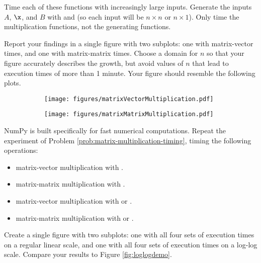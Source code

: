 Time each of these functions with increasingly large inputs.
Generate the inputs $A$, $\x$, and $B$ with  and  (so each input will be $n \times n$ or $n \times 1$).
Only time the multiplication functions, not the generating functions.

Report your findings in a single figure with two subplots: one with matrix-vector times, and one with matrix-matrix times.
Choose a domain for $n$ so that your figure accurately describes the growth, but avoid values of $n$ that lead to execution times of more than 1 minute.
Your figure should resemble the following plots.

\begin{figure}[H] %
\captionsetup[subfigure]{justification=centering}
\centering
\begin{subfigure}{.5\textwidth}
    \centering
    \texttt{[image: figures/matrixVectorMultiplication.pdf]}
\end{subfigure}%
\begin{subfigure}{.482\textwidth}
    \centering
    \texttt{[image: figures/matrixMatrixMultiplication.pdf]}
\end{subfigure}
\end{figure}

\label{prob:matrix-multiplication-timing}
NumPy is built specifically for fast numerical computations.
Repeat the experiment of Problem \ref{prob:matrix-multiplication-timing}, timing the following operations:
%
\begin{itemize}
\item matrix-vector multiplication with .
\item matrix-matrix multiplication with .
\item matrix-vector multiplication with  or .
\item matrix-matrix multiplication with  or .
\end{itemize}

Create a single figure with two subplots: one with all four sets of execution times on a regular linear scale, and one with all four sets of execution times on a log-log scale.
Compare your results to Figure \ref{fig:loglogdemo}.
\label{prob:numpy-is-awesome}
